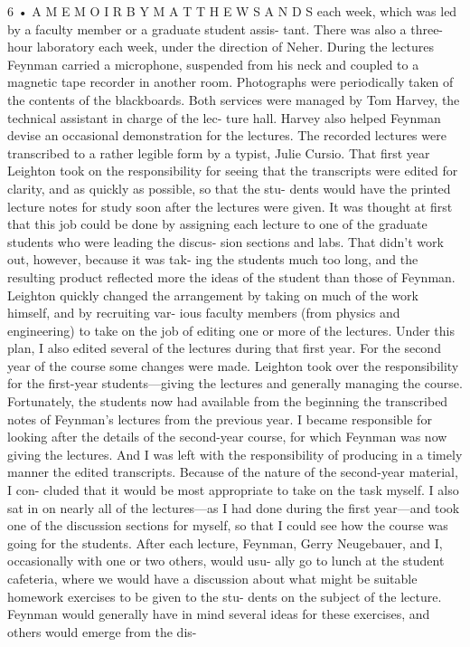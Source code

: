 \documentclass[10pt,oneside]{article}
\begin{document}
6 • A  M E M O I R  B Y  M A T T H E W  S A N D S each week, which was led by a faculty member or a graduate student assis- tant. There was also a three-hour laboratory each week, under the direction of Neher. During the lectures Feynman carried a microphone, suspended from his neck and coupled to a magnetic tape recorder in another room. Photographs were periodically taken of the contents of the blackboards. Both services were managed by Tom Harvey, the technical assistant in charge of the lec- ture hall. Harvey also helped Feynman devise an occasional demonstration for the lectures. The recorded lectures were transcribed to a rather legible form by a typist, Julie Cursio. That first year Leighton took on the responsibility for seeing that the transcripts were edited for clarity, and as quickly as possible, so that the stu- dents would have the printed lecture notes for study soon after the lectures were given. It was thought at first that this job could be done by assigning each lecture to one of the graduate students who were leading the discus- sion sections and labs. That didn’t work out, however, because it was tak- ing the students much too long, and the resulting product reflected more the ideas of the student than those of Feynman. Leighton quickly changed the arrangement by taking on much of the work himself, and by recruiting var- ious faculty members (from physics and engineering) to take on the job of editing one or more of the lectures. Under this plan, I also edited several of the lectures during that first year. For the second year of the course some changes were made. Leighton took over the responsibility for the first-year students---giving the lectures and generally managing the course. Fortunately, the students now had available from the beginning the transcribed notes of Feynman’s lectures from the previous year. I became responsible for looking after the details of the second-year course, for which Feynman was now giving the lectures. And I was left with the responsibility of producing in a timely manner the edited transcripts. Because of the nature of the second-year material, I con- cluded that it would be most appropriate to take on the task myself. I also sat in on nearly all of the lectures---as I had done during the first year---and took one of the discussion sections for myself, so that I could see how the course was going for the students. After each lecture, Feynman, Gerry Neugebauer, and I, occasionally with one or two others, would usu- ally go to lunch at the student cafeteria, where we would have a discussion about what might be suitable homework exercises to be given to the stu- dents on the subject of the lecture. Feynman would generally have in mind several ideas for these exercises, and others would emerge from the dis-\par
\end{document}
